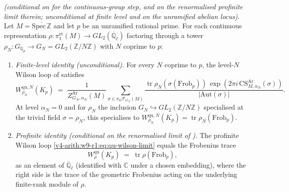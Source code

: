 \begin{theorem}[Wilson line = Frobenius trace on unramified locus]
\label{v4-arith:w9-r1:thm:main}
\ClaimStatusProvedHereConditional \emph{(conditional on
 for the continuous-group step, and
on the renormalised profinite limit therein; unconditional at finite
level and on the unramified abelian locus)}. Let
\(M=\overline{\mathrm{Spec}\,\mathbb Z}\) and let \(p\) be an unramified
rational prime. For each continuous representation
\(\rho\colon\pi_{1}^{\mathrm{\acute et}}(M)\to GL_{2}(\overline{\mathbb Q}_{\ell})\)
factoring through a tower
\(\rho_{N}\colon G_{\mathbb Q_{p}}\to G_{N}=GL_{2}(\mathbb Z/N\mathbb Z)\)
with \(N\) coprime to \(p\):
\begin{enumerate}
\item \emph{Finite-level identity (unconditional).} For every \(N\)
coprime to \(p\), the level-\(N\) Wilson loop of
 satisfies
\begin{equation}
\label{v4-arith:w9-r1:eq:main-finite}
W^{\mathrm{qu},N}_{\rho_{N}}(K_{p})
\;=\;
\frac{1}{Z^{\mathrm{Ar}}_{G_{N},\alpha_{N}}(M)}
\sum_{\sigma\in\pi_{0}\mathcal F_{G_{N}}(M)}
\frac{\operatorname{tr}\rho_{N}(\sigma(\mathrm{Frob}_{p}))\,
\exp(2\pi i\,\mathrm{CS}^{\mathrm{Ar}}_{M,\alpha_{N}}(\sigma))}
{|\mathrm{Aut}(\sigma)|}.
\end{equation}
At level \(\alpha_{N}=0\) and for \(\rho_{N}\) the inclusion
\(G_{N}\hookrightarrow GL_{2}(\mathbb Z/N\mathbb Z)\) specialised at the
trivial field \(\sigma=\rho_{N}\), this specialises to
\(W^{\mathrm{qu},N}_{\rho_{N}}(K_{p})=\operatorname{tr}\rho_{N}(\mathrm{Frob}_{p})\).
\item \emph{Profinite identity (conditional on the renormalised
limit of ).} The
profinite Wilson loop
\eqref{v4-arith:w9-r1:eq:qu-wilson-limit} equals the Frobenius trace
\begin{equation}
\label{v4-arith:w9-r1:eq:main-profinite}
W^{\mathrm{qu}}_{\rho}(K_{p})
\;=\;\operatorname{tr}\rho(\mathrm{Frob}_{p}),
\end{equation}
as an element of \(\overline{\mathbb Q}_{\ell}\) (identified with
\(\mathbb C\) under a chosen embedding), where the right side is the
trace of the geometric Frobenius acting on the underlying finite-rank
module of \(\rho\).
\end{enumerate}
\end{theorem}

